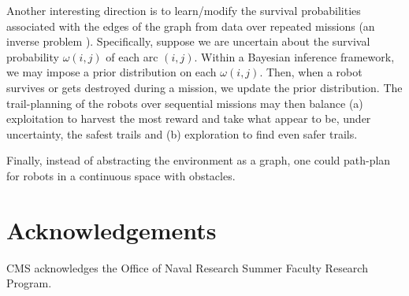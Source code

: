 \documentclass[11pt, oneside]{article}
\begin{document}
Another interesting direction is to learn/modify the survival probabilities associated with the edges of the graph from data over repeated missions (an inverse problem \cite{burton1992instance}). 
Specifically, suppose we are uncertain about the survival probability $\omega(i, j)$ of each arc $(i,j)$. Within a Bayesian inference framework, we may impose a prior distribution on each $\omega(i,j)$. Then, when a robot survives or gets destroyed during a mission, we update the prior distribution. 
The trail-planning of the robots over sequential missions may then balance (a) exploitation to harvest the most reward and take what appear to be, under uncertainty, the safest trails and (b) exploration to find even safer trails.

Finally, instead of abstracting the environment as a graph, one could path-plan for robots in a continuous space with obstacles. 

\section*{Acknowledgements} CMS acknowledges the Office of Naval Research Summer Faculty Research Program.



\end{document}
